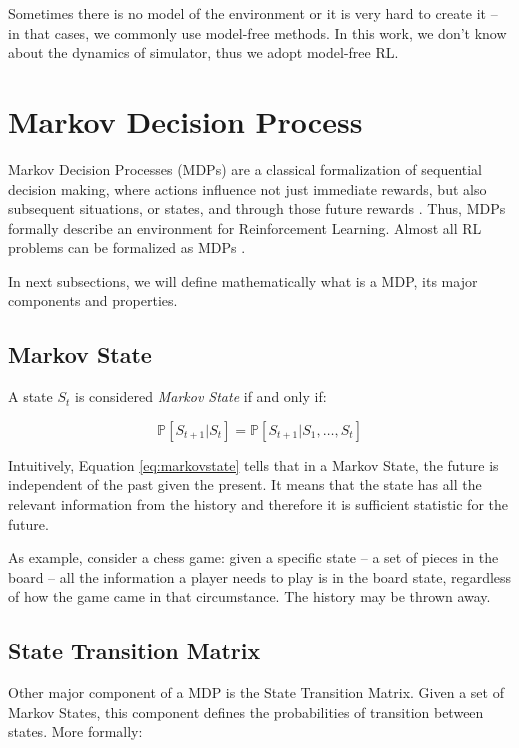 Sometimes there is no model of the environment or it is very hard to create it -- in that cases, we commonly use model-free methods. In this work, we don't know about the dynamics of simulator, thus we adopt model-free RL.

\section{Markov Decision Process}

 Markov Decision Processes (MDPs) are a classical
formalization of sequential decision making, where actions influence not just immediate rewards, but also
subsequent situations, or states, and through those future rewards \cite{sutton1998rli}. Thus, MDPs formally describe an environment for Reinforcement Learning. Almost all RL problems can be formalized as MDPs \cite{davidsilverlec2}.

In next subsections, we will define mathematically what is a MDP, its major components and properties.

\subsection{Markov State}\label{sec:markovstate}

A state $S_{t}$ is considered \textit{Markov State} if and only if:

\begin{equation}\label{eq:markovstate}
	\mathbb{P}[S_{t+1} | S_{t}] = \mathbb{P}[S_{t+1} | S_{1},\dots, S_{t}]
\end{equation}

Intuitively, Equation \ref{eq:markovstate} tells that in a Markov State, the future is independent of the past given the present. It means that the state has all the relevant information from the history and therefore it is sufficient statistic for the future. 

As example, consider a chess game: given a specific state -- a set of pieces in the board -- all the information a player needs to play is in the board state, regardless of how the game came in that circumstance. The history may be thrown away.

\subsection{State Transition Matrix}\label{sec:statetransition}

Other major component of a MDP is the State Transition Matrix. Given a set of Markov States, this component defines the probabilities of transition between states. More formally:

